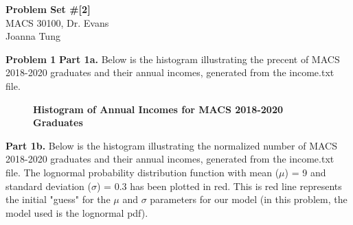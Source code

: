 \documentclass[letterpaper,12pt]{article}
\theoremstyle{definition}
\begin{document}
\begin{flushleft}
  \textbf{\large{Problem Set \#[2]}} \\
  MACS 30100, Dr. Evans \\
  Joanna Tung
\end{flushleft}

\vspace{5mm}

\noindent\textbf{Problem 1}
\noindent\newline\textbf{Part 1a. }Below is the histogram illustrating the precent of MACS 2018-2020 graduates and their annual incomes, generated from the income.txt file.

\begin{figure}[htb]\centering\captionsetup{width=4.0in}
  \caption{\textbf{Histogram of Annual Incomes for MACS 2018-2020 Graduates}}\label{FigPS2_1a}
\end{figure}

\noindent\newline\textbf{Part 1b.} Below is the histogram illustrating the normalized number of MACS 2018-2020 graduates and their annual incomes, generated from the income.txt file. The lognormal probability distribution function with mean ($\mu$) = 9 and standard deviation ($\sigma$) = 0.3 has been plotted in red. This is red line represents the initial "guess" for the $\mu$ and $\sigma$ parameters for our model (in this problem, the model used is the lognormal pdf).

\clearpage
\end{document}
